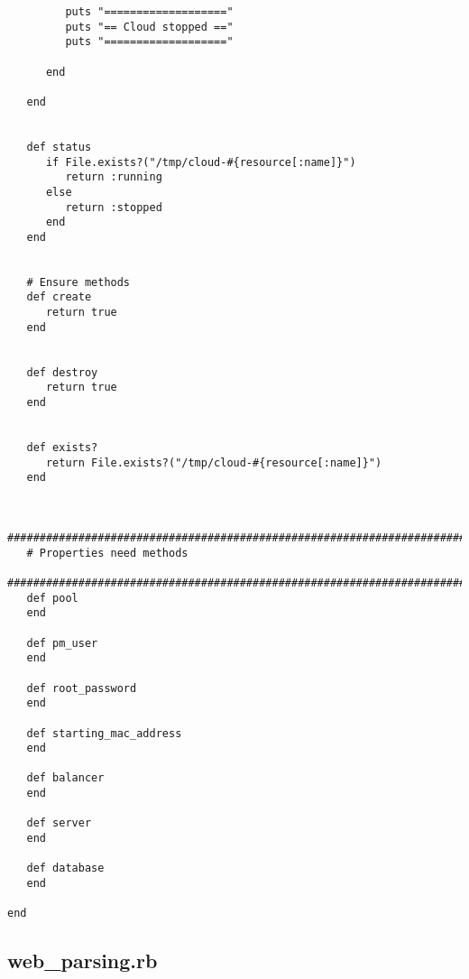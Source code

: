 \begin{lstlisting}
         puts "==================="
         puts "== Cloud stopped =="
         puts "==================="
         
      end
   
   end


   def status
      if File.exists?("/tmp/cloud-#{resource[:name]}")
         return :running
      else
         return :stopped
      end
   end


   # Ensure methods
   def create
      return true
   end
   

   def destroy
      return true
   end


   def exists?
      return File.exists?("/tmp/cloud-#{resource[:name]}")
   end
   
   
   #############################################################################
   # Properties need methods
   #############################################################################
   def pool
   end
   
   def pm_user
   end
   
   def root_password
   end
   
   def starting_mac_address
   end
   
   def balancer
   end
   
   def server
   end
   
   def database
   end
   
end
\end{lstlisting}


\subsection{web\_parsing.rb}


